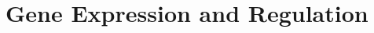 \documentclass[../bio.tex]{subfiles}
\begin{document}
\chapter{Gene Expression and Regulation}
\end{document}
